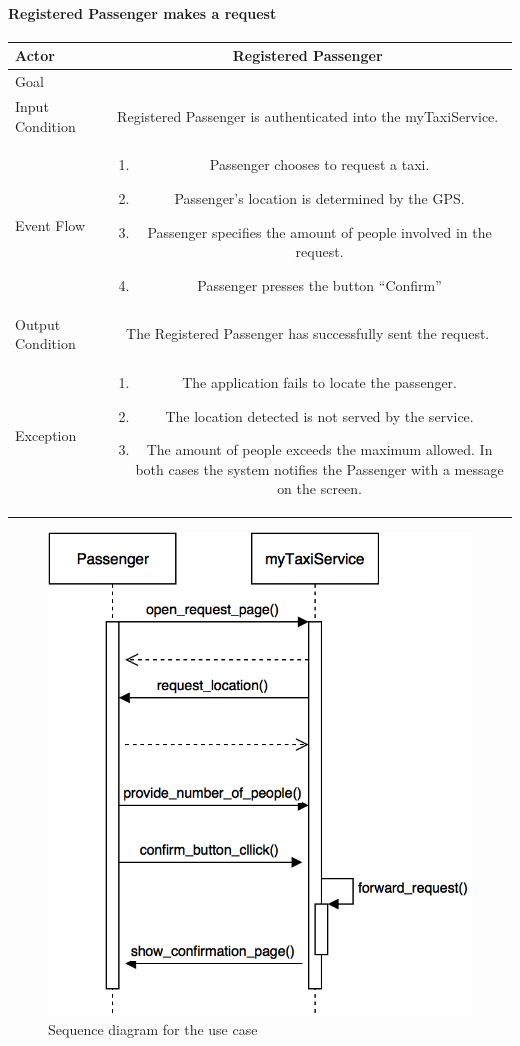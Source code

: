 \documentclass[a4paper,12pt,dvipsnames]{article}%
\newcommand{\usecasetable}[6]{
\begin{center}
\def\arraystretch{1.5}
\begin{tabularx}{\textwidth}{|s|C|}
\hline
Actor & #1\\
\hline
Goal & #2\\
\hline
Input Condition & #3 \\
\hline
Event Flow & #4\\
\hline
Output Condition & #5\\
\hline
Exception & #6\\
\hline
\end{tabularx}
\end{center}
}
\begin{document}
\paragraph{Registered Passenger makes a request}
\usecasetable{Registered Passenger}{}{Registered Passenger is authenticated into the  myTaxiService.}
{
\begin{minipage}[b]{11cm}
\begin{enumerate}
\item Passenger chooses to request a taxi.
\item Passenger's location is determined by the GPS.
\item Passenger specifies the amount of people involved in the request.
\item Passenger presses the button ``Confirm''
\end{enumerate}
\end{minipage}
}
{The Registered Passenger has successfully sent the request.}
{

\begin{minipage}[b]{11cm}
\begin{enumerate}
\item The application fails to locate the passenger.
\item The location detected is not served by the service.
\item The amount of people exceeds the maximum allowed.
In both cases the system notifies the Passenger with a message on the screen.
\end{enumerate}
\end{minipage}
}
\begin{figure}[H]
\centering
\includegraphics[scale=.3]{make_request.png}
\caption{Sequence diagram for the use case}
\end{figure}
\break
\end{document}
